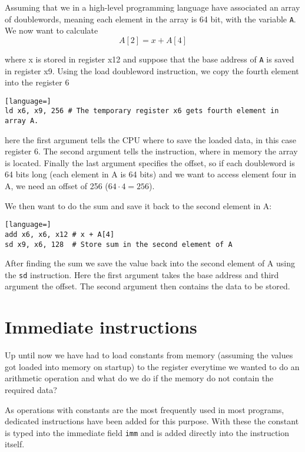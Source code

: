     Assuming that we in a high-level programming language have associated an array of doublewords, meaning each element in the array is 64 bit, with the variable \texttt{A}. We now want to calculate
    \begin{equation}
        A[2] = x + A[4]
    \end{equation}
    
    where x is stored in register x12 and suppose that the base address of \texttt{A} is saved in register x9. Using the load doubleword instruction, we copy the fourth element into the register 6
    \begin{lstlisting}[language=]
ld x6, x9, 256 # The temporary register x6 gets fourth element in array A.
    \end{lstlisting}
    here the first argument tells the CPU where to save the loaded data, in this case register 6. The second argument tells the instruction, where in memory the array is located. Finally the last argument specifies the offset, so if each doubleword is 64 bits long (each element in A is 64 bits) and we want to access element four in A, we need an offset of 256 ($64\cdot 4=256$).
    
    We then want to do the sum and save it back to the second element in A:
    \begin{lstlisting}[language=]
add x6, x6, x12 # x + A[4]
sd x9, x6, 128  # Store sum in the second element of A 
    \end{lstlisting}
    
    After finding the sum we save the value back into the second element of A using the \texttt{sd} instruction. Here the first argument takes the base address and third argument the offset. The second argument then contains the data to be stored. 
    
    
    
\section{Immediate instructions}
    Up until now we have had to load constants from memory (assuming the values got loaded into memory on startup) to the register everytime we wanted to do an arithmetic operation and what do we do if the memory do not contain the required data? 
    
    As operations with constants are the most frequently used in most programs, dedicated instructions have been added for this purpose. With these the constant is typed into the immediate field \texttt{imm} and is added directly into the instruction itself. 
    
